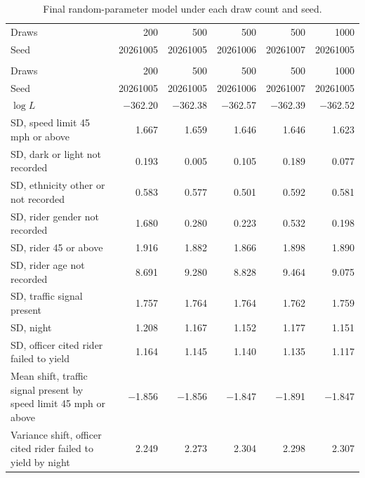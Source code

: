 \begin{longtable}{>{\raggedright\arraybackslash}p{6.2cm}rrrrr}
\caption{Final random-parameter model under each draw count and seed.}\label{sup:tab_rpstability}\\
\toprule
Draws & 200 & 500 & 500 & 500 & 1000 \\
Seed & 20261005 & 20261005 & 20261006 & 20261007 & 20261005 \\
\midrule
\endfirsthead
\multicolumn{6}{l}{\textbf{\tablename\ \thetable{} \textit{(continued)}}} \\
\toprule
Draws & 200 & 500 & 500 & 500 & 1000 \\
Seed & 20261005 & 20261005 & 20261006 & 20261007 & 20261005 \\
\midrule
\endhead
$\log L$ & $-$362.20 & $-$362.38 & $-$362.57 & $-$362.39 & $-$362.52 \\
SD, speed limit 45 mph or above & 1.667 & 1.659 & 1.646 & 1.646 & 1.623 \\
SD, dark or light not recorded & 0.193 & 0.005 & 0.105 & 0.189 & 0.077 \\
SD, ethnicity other or not recorded & 0.583 & 0.577 & 0.501 & 0.592 & 0.581 \\
SD, rider gender not recorded & 1.680 & 0.280 & 0.223 & 0.532 & 0.198 \\
SD, rider 45 or above & 1.916 & 1.882 & 1.866 & 1.898 & 1.890 \\
SD, rider age not recorded & 8.691 & 9.280 & 8.828 & 9.464 & 9.075 \\
SD, traffic signal present & 1.757 & 1.764 & 1.764 & 1.762 & 1.759 \\
SD, night & 1.208 & 1.167 & 1.152 & 1.177 & 1.151 \\
SD, officer cited rider failed to yield & 1.164 & 1.145 & 1.140 & 1.135 & 1.117 \\
Mean shift, traffic signal present by speed limit 45 mph or above & $-$1.856 & $-$1.856 & $-$1.847 & $-$1.891 & $-$1.847 \\
Variance shift, officer cited rider failed to yield by night & 2.249 & 2.273 & 2.304 & 2.298 & 2.307 \\
\bottomrule
\end{longtable}
